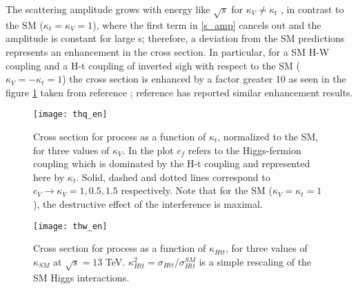 \noindent The scattering amplitude grows with energy like $\sqrt{s}$ for $\kappa_V \neq \kappa_t$ , in contrast to the SM ($\kappa_t=\kappa_V=1$), where the first term in \ref{s_amp} cancels out and the amplitude is constant for large s; therefore, a deviation from the SM predictions represents an enhancement in the \tHq cross section. In particular, for a SM H-W coupling and a H-t coupling of inverted sigh with respect to the SM ($\kappa_V =-\kappa_t=1$) the \tHq cross section is enhanced by a factor greater 10 as seen in the figure \ref{thq_en} taken from reference \cite{farina}; reference \cite{biswas2} has reported similar enhancement results.

\begin{figure}[h!]
\centering
\texttt{[image: thq\_en]}\\
\caption[Cross section for tHq process as a function of $\kappa_t$]{Cross section for \tHq process as a function of $\kappa_t$, normalized to the SM, for three values of $\kappa_V$. In the plot $c_f$ refers to the Higgs-fermion coupling which is dominated by the H-t coupling and represented here by $\kappa_t$. Solid, dashed and dotted lines correspond to $c_V \to \kappa_V= 1, 0.5, 1.5$ respectively. Note that for the SM ($\kappa_V=\kappa_t=1$), the destructive effect of the interference is maximal.} 
\label{thq_en}
\end{figure}

\begin{figure}[h!]
\centering
\texttt{[image: thw\_en]}\\
\caption[Cross section for \tHW process as a function of $\kappa_{Htt}$]{Cross section for \tHW process as a function of $\kappa_{Htt}$, for three values of $\kappa_{SM}$ at $\sqrt{s}=13$ TeV. $\kappa_{Htt}^2=\sigma_{Htt}/\sigma_{Htt}^{SM}$ is a simple rescaling of the SM Higgs interactions.} 
\label{thw_en}
\end{figure}

